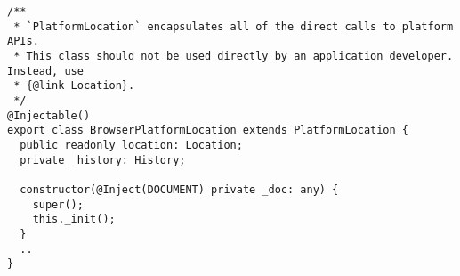 \begin{verbatim}
/**
 * `PlatformLocation` encapsulates all of the direct calls to platform APIs.
 * This class should not be used directly by an application developer.
Instead, use
 * {@link Location}.
 */
@Injectable()
export class BrowserPlatformLocation extends PlatformLocation {
  public readonly location: Location;
  private _history: History;

  constructor(@Inject(DOCUMENT) private _doc: any) {
    super();
    this._init();
  }
  ..
}
\end{verbatim}

